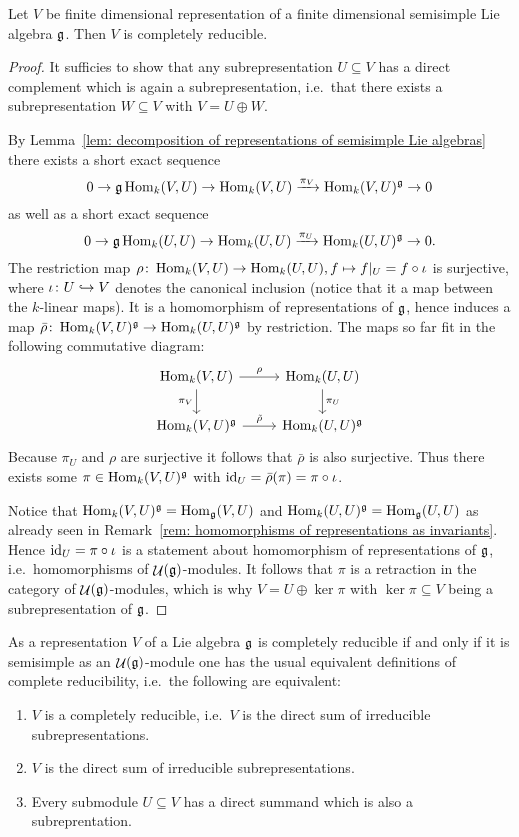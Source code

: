 \begin{theorem}[Weyl]
 Let $V$ be finite dimensional representation of a finite dimensional semisimple Lie algebra $\mathfrak{g}$. Then $V$ is completely reducible.
\end{theorem}
\begin{proof}
 It sufficies to show that any subrepresentation $U \subseteq V$ has a direct complement which is again a subrepresentation, i.e.\ that there exists a subrepresentation $W \subseteq V$ with $V = U \oplus W$.
 
 By Lemma~\ref{lem: decomposition of representations of semisimple Lie algebras} there exists a short exact sequence
 \[
  0 \to \mathfrak{g} \operatorname{Hom}_k(V, U) \to \operatorname{Hom}_k(V,U) \xrightarrow{\pi_V} \operatorname{Hom}_k(V,U)^{\mathfrak{g}} \to 0
 \]
 as well as a short exact sequence
 \[
  0 \to \mathfrak{g} \operatorname{Hom}_k(U, U) \to \operatorname{Hom}_k(U,U) \xrightarrow{\pi_U} \operatorname{Hom}_k(U,U)^{\mathfrak{g}} \to 0.
 \]
 The restriction map $\rho \colon \operatorname{Hom}_k(V,U) \to \operatorname{Hom}_k(U,U), f \mapsto f|_{U} = f \circ \iota$ is surjective, where $\iota \colon U \hookrightarrow V$ denotes the canonical inclusion (notice that it a map between the $k$-linear maps). It is a homomorphism of representations of $\mathfrak{g}$, hence induces a map $\bar{\rho} \colon \operatorname{Hom}_k(V,U)^{\mathfrak{g}} \to \operatorname{Hom}_k(U,U)^{\mathfrak{g}}$ by restriction. The maps so far fit in the following commutative diagram:
 \[
   \begin{tikzcd}
     \Hom_k(V,U)
     \arrow{r}[above]{\rho}
     \arrow{d}[left]{\pi_V}
     &
     \Hom_k(U,U)
     \arrow{d}[right]{\pi_U}
     \\
     \Hom_k(V,U)^\g
     \arrow{r}[above]{\tilde{\rho}}
     &
     \Hom_k(U,U)^\g
   \end{tikzcd}
 \]
 Because $\pi_U$ and $\rho$ are surjective it follows that $\bar{\rho}$ is also surjective. Thus there exists some $\pi \in \operatorname{Hom}_k(V,U)^{\mathfrak{g}}$ with $\operatorname{id}_U = \bar{\rho}(\pi) = \pi \circ \iota$.
 
 Notice that $\operatorname{Hom}_k(V,U)^{\mathfrak{g}} = \operatorname{Hom}_{\mathfrak{g}}(V,U)$ and $\operatorname{Hom}_k(U,U)^{\mathfrak{g}} = \operatorname{Hom}_{\mathfrak{g}}(U,U)$ as already seen in Remark~\ref{rem: homomorphisms of representations as invariants}. Hence $\operatorname{id}_U = \pi \circ \iota$ is a statement about homomorphism of representations of $\mathfrak{g}$, i.e.\ homomorphisms of $\mathop{\mathcal{U}}(\mathfrak{g})$-modules. It follows that $\pi$ is a retraction in the category of $\mathop{\mathcal{U}}(\mathfrak{g})$-modules, which is why $V = U \oplus \ker \pi$ with $\ker \pi \subseteq V$ being a subrepresentation of $\mathfrak{g}$.
\end{proof}


\begin{remark}
 As a representation $V$ of a Lie algebra $\mathfrak{g}$ is completely reducible if and only if it is semisimple as an $\mathop{\mathcal{U}}(\mathfrak{g})$-module one has the usual equivalent definitions of complete reducibility, i.e.\ the following are equivalent:
 \begin{enumerate}
  \item
   $V$ is a completely reducible, i.e.\ $V$ is the direct sum of irreducible subrepresentations.
  \item
   $V$ is the direct sum of irreducible subrepresentations.
  \item
   Every submodule $U \subseteq V$ has a direct summand which is also a subreprentation.
 \end{enumerate}
\end{remark}


